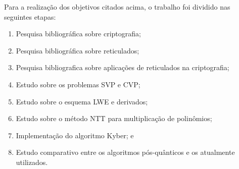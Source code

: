 Para a realização dos objetivos citados acima, o trabalho foi dividido nas seguintes etapas:

\begin{enumerate}
    \item Pesquisa bibliográfica sobre criptografia;
    \item Pesquisa bibliográfica sobre reticulados;
    \item Pesquisa bibliografica sobre aplicações de reticulados na criptografia;
    \item Estudo sobre os problemas SVP e CVP;
    \item Estudo sobre o esquema LWE e derivados;
    \item Estudo sobre o método NTT para multiplicação de polinômios;
    \item Implementação do algoritmo Kyber; e
    \item Estudo comparativo entre os algoritmos pós-quânticos e os atualmente utilizados.
\end{enumerate}

